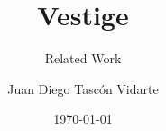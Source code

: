 \documentclass{beamer}
\title{Vestige}
\subtitle{Related Work}
\author{Juan Diego Tascón Vidarte}
\institute{Konkuk University \\ HCI Lab}
\date{\today{}}
\begin{document}
\begin{frame}
	\titlepage
\end{frame}

\begin{frame}{}
	\tableofcontents
\end{frame}





\nocite{*}
\end{document}
